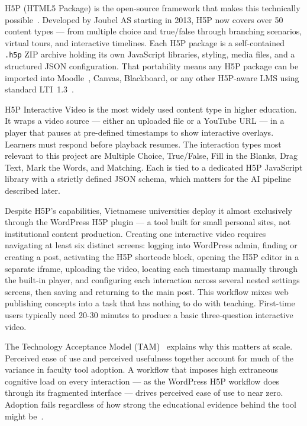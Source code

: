 H5P (HTML5 Package) is the open-source framework that makes this technically possible~\cite{h5p2023,lumieducation2023}. Developed by Joubel AS starting in 2013, H5P now covers over 50 content types --- from multiple choice and true/false through branching scenarios, virtual tours, and interactive timelines. Each H5P package is a self-contained \texttt{.h5p} ZIP archive holding its own JavaScript libraries, styling, media files, and a structured JSON configuration. That portability means any H5P package can be imported into Moodle~\cite{moodle2023}, Canvas, Blackboard, or any other H5P-aware LMS using standard LTI~1.3~\cite{lti2019}.

H5P Interactive Video is the most widely used content type in higher education. It wraps a video source --- either an uploaded file or a YouTube URL --- in a player that pauses at pre-defined timestamps to show interactive overlays. Learners must respond before playback resumes. The interaction types most relevant to this project are Multiple Choice, True/False, Fill in the Blanks, Drag Text, Mark the Words, and Matching. Each is tied to a dedicated H5P JavaScript library with a strictly defined JSON schema, which matters for the AI pipeline described later.

Despite H5P's capabilities, Vietnamese universities deploy it almost exclusively through the WordPress H5P plugin --- a tool built for small personal sites, not institutional content production. Creating one interactive video requires navigating at least six distinct screens: logging into WordPress admin, finding or creating a post, activating the H5P shortcode block, opening the H5P editor in a separate iframe, uploading the video, locating each timestamp manually through the built-in player, and configuring each interaction across several nested settings screens, then saving and returning to the main post. This workflow mixes web publishing concepts into a task that has nothing to do with teaching. First-time users typically need 20-30 minutes to produce a basic three-question interactive video.

The Technology Acceptance Model (TAM)~\cite{davis1989} explains why this matters at scale. Perceived ease of use and perceived usefulness together account for much of the variance in faculty tool adoption. A workflow that imposes high extraneous cognitive load on every interaction --- as the WordPress H5P workflow does through its fragmented interface --- drives perceived ease of use to near zero. Adoption fails regardless of how strong the educational evidence behind the tool might be~\cite{sweller1988,chandler1991}.

